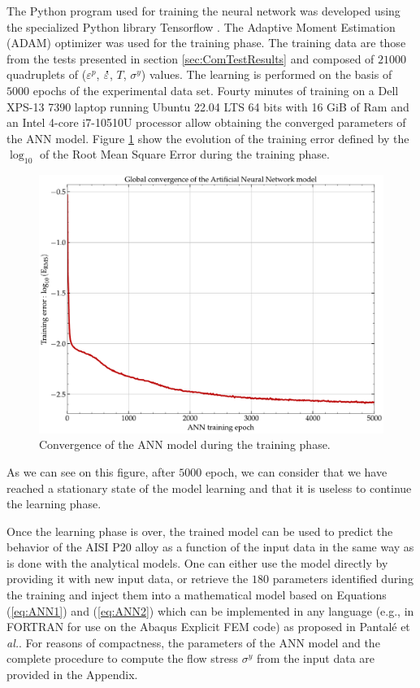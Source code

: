 \documentclass[twoside,english,1p,final,sort&compress]{elsarticle}
\makeatletter
\theoremstyle{plain}
\newcommand{\mdot}[1]{\accentset{\mbox{\bfseries .}}{#1}}
\newcommand*{\eal}{et \emph{al.}\@\xspace}
\newcommand*{\eg}{e.g.,\@\xspace}
\makeatother
\begin{document}
The Python program used for training the neural network was developed using the specialized Python library Tensorflow \cite{Abadi-2016}.
The Adaptive Moment Estimation (ADAM) optimizer \cite{Kingma-2015} was used for the training phase.
The training data are those from the tests presented in section \ref{sec:ComTestResults} and composed of $21000$ quadruplets of ($\varepsilon^p$, $\mdot\varepsilon$, $T$, $\sigma^y$) values.
The learning is performed on the basis of $5000$ epochs of the experimental data set.
Fourty minutes of training on a Dell XPS-13 7390 laptop running Ubuntu 22.04 LTS 64 bits with 16 GiB of Ram and an Intel 4-core i7-10510U processor allow obtaining the converged parameters of the ANN model.
Figure \ref{fig:ANN-6-conv} show the evolution of the training error defined by the $\log_{10}$ of the Root Mean Square Error during the training phase.
\begin{figure}[!ht]
\centering
\includegraphics[width=0.7\columnwidth]
{Figures/Conv-ANN-6}
\caption{Convergence of the ANN model during the training phase.}
\label{fig:ANN-6-conv}
\end{figure}
As we can see on this figure, after $5000$ epoch, we can consider that we have reached a stationary state of the model learning and that it is useless to continue the learning phase.

Once the learning phase is over, the trained model can be used to predict the behavior of the AISI P20 alloy as a function of the input data in the same way as is done with the analytical models.
One can either use the model directly by providing it with new input data, or retrieve the $180$ parameters identified during the training and inject them into a mathematical model based on Equations (\ref{eq:ANN1}) and (\ref{eq:ANN2}) which can be implemented in any language (\eg in FORTRAN for use on the Abaqus Explicit FEM code) as proposed in Pantalé \eal \cite{Pantale-2021}.
For reasons of compactness, the parameters of the ANN model and the complete procedure to compute the flow stress $\sigma^y$ from the input data are provided in the Appendix.
\end{document}
